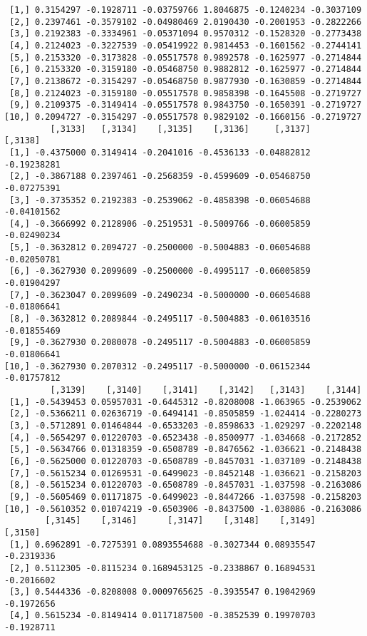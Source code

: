 \documentclass[
  letterpaper,
  DIV=11,
  numbers=noendperiod]{scrreprt}
\begin{document}
\begin{verbatim}
 [1,] 0.3154297 -0.1928711 -0.03759766 1.8046875 -0.1240234 -0.3037109
 [2,] 0.2397461 -0.3579102 -0.04980469 2.0190430 -0.2001953 -0.2822266
 [3,] 0.2192383 -0.3334961 -0.05371094 0.9570312 -0.1528320 -0.2773438
 [4,] 0.2124023 -0.3227539 -0.05419922 0.9814453 -0.1601562 -0.2744141
 [5,] 0.2153320 -0.3173828 -0.05517578 0.9892578 -0.1625977 -0.2714844
 [6,] 0.2153320 -0.3159180 -0.05468750 0.9882812 -0.1625977 -0.2714844
 [7,] 0.2138672 -0.3154297 -0.05468750 0.9877930 -0.1630859 -0.2714844
 [8,] 0.2124023 -0.3159180 -0.05517578 0.9858398 -0.1645508 -0.2719727
 [9,] 0.2109375 -0.3149414 -0.05517578 0.9843750 -0.1650391 -0.2719727
[10,] 0.2094727 -0.3154297 -0.05517578 0.9829102 -0.1660156 -0.2719727
         [,3133]   [,3134]    [,3135]    [,3136]     [,3137]     [,3138]
 [1,] -0.4375000 0.3149414 -0.2041016 -0.4536133 -0.04882812 -0.19238281
 [2,] -0.3867188 0.2397461 -0.2568359 -0.4599609 -0.05468750 -0.07275391
 [3,] -0.3735352 0.2192383 -0.2539062 -0.4858398 -0.06054688 -0.04101562
 [4,] -0.3666992 0.2128906 -0.2519531 -0.5009766 -0.06005859 -0.02490234
 [5,] -0.3632812 0.2094727 -0.2500000 -0.5004883 -0.06054688 -0.02050781
 [6,] -0.3627930 0.2099609 -0.2500000 -0.4995117 -0.06005859 -0.01904297
 [7,] -0.3623047 0.2099609 -0.2490234 -0.5000000 -0.06054688 -0.01806641
 [8,] -0.3632812 0.2089844 -0.2495117 -0.5004883 -0.06103516 -0.01855469
 [9,] -0.3627930 0.2080078 -0.2495117 -0.5004883 -0.06005859 -0.01806641
[10,] -0.3627930 0.2070312 -0.2495117 -0.5000000 -0.06152344 -0.01757812
         [,3139]    [,3140]    [,3141]    [,3142]   [,3143]    [,3144]
 [1,] -0.5439453 0.05957031 -0.6445312 -0.8208008 -1.063965 -0.2539062
 [2,] -0.5366211 0.02636719 -0.6494141 -0.8505859 -1.024414 -0.2280273
 [3,] -0.5712891 0.01464844 -0.6533203 -0.8598633 -1.029297 -0.2202148
 [4,] -0.5654297 0.01220703 -0.6523438 -0.8500977 -1.034668 -0.2172852
 [5,] -0.5634766 0.01318359 -0.6508789 -0.8476562 -1.036621 -0.2148438
 [6,] -0.5625000 0.01220703 -0.6508789 -0.8457031 -1.037109 -0.2148438
 [7,] -0.5615234 0.01269531 -0.6499023 -0.8452148 -1.036621 -0.2158203
 [8,] -0.5615234 0.01220703 -0.6508789 -0.8457031 -1.037598 -0.2163086
 [9,] -0.5605469 0.01171875 -0.6499023 -0.8447266 -1.037598 -0.2158203
[10,] -0.5610352 0.01074219 -0.6503906 -0.8437500 -1.038086 -0.2163086
        [,3145]    [,3146]      [,3147]    [,3148]    [,3149]    [,3150]
 [1,] 0.6962891 -0.7275391 0.0893554688 -0.3027344 0.08935547 -0.2319336
 [2,] 0.5112305 -0.8115234 0.1689453125 -0.2338867 0.16894531 -0.2016602
 [3,] 0.5444336 -0.8208008 0.0009765625 -0.3935547 0.19042969 -0.1972656
 [4,] 0.5615234 -0.8149414 0.0117187500 -0.3852539 0.19970703 -0.1928711

\end{verbatim}
\end{document}
